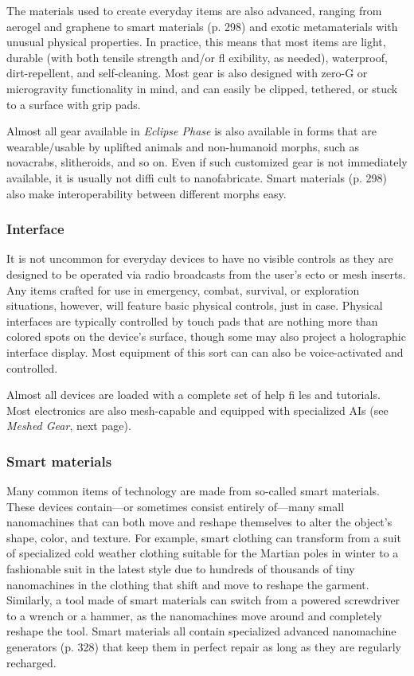 The materials used to create everyday items are
also advanced, ranging from aerogel and graphene
to smart materials (p. 298) and exotic metamaterials
with unusual physical properties. In practice, this
means that most items are light, durable (with both
tensile strength and/or fl exibility, as needed), waterproof,
dirt-repellent, and self-cleaning. Most gear is
also designed with zero-G or microgravity functionality
in mind, and can easily be clipped, tethered, or
stuck to a surface with grip pads.

Almost all gear available in \emph{Eclipse Phase} is also
available in forms that are wearable/usable by uplifted
animals and non-humanoid morphs, such
as novacrabs, slitheroids, and so on. Even if such
customized gear is not immediately available, it is
usually not diffi cult to nanofabricate. Smart materials
(p. 298) also make interoperability between different
morphs easy.

\subsubsection{Interface}

It is not uncommon for everyday devices to have no
visible controls as they are designed to be operated via
radio broadcasts from the user’s ecto or mesh inserts.
Any items crafted for use in emergency, combat, survival,
or exploration situations, however, will feature
basic physical controls, just in case. Physical interfaces
are typically controlled by touch pads that are nothing
more than colored spots on the device’s surface,
though some may also project a holographic interface
display. Most equipment of this sort can can also be
voice-activated and controlled.

Almost all devices are loaded with a complete set
of help fi les and tutorials. Most electronics are also
mesh-capable and equipped with specialized AIs (see
\emph{Meshed Gear}, next page).

\subsubsection{Smart materials}

Many common items of technology are made from
so-called smart materials. These devices contain—or
sometimes consist entirely of—many small nanomachines
that can both move and reshape themselves
to alter the object’s shape, color, and texture. For
example, smart clothing can transform from a suit of
specialized cold weather clothing suitable for the Martian
poles in winter to a fashionable suit in the latest
style due to hundreds of thousands of tiny nanomachines
in the clothing that shift and move to reshape
the garment. Similarly, a tool made of smart materials
can switch from a powered screwdriver to a wrench
or a hammer, as the nanomachines move around and
completely reshape the tool. Smart materials all contain
specialized advanced nanomachine generators (p.
328) that keep them in perfect repair as long as they
are regularly recharged.



